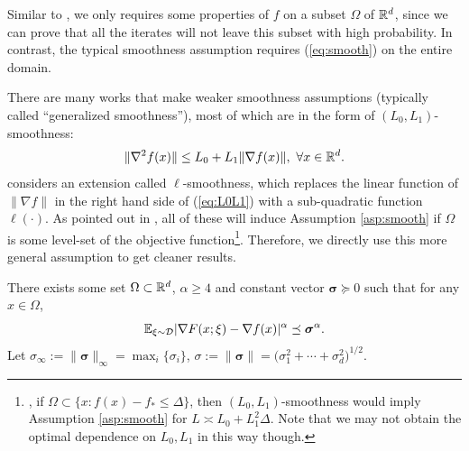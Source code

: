 \documentclass{article} %
\numberwithin{equation}{section}
\renewcommand{\eqref}[1]{(\ref{#1})}
\begin{document}
Similar to \citet{pmlr-v202-sadiev23a}, we only requires some properties of $f$ on a subset $\Omega$ of $\mathbb{R}^d$, since we can prove that all the iterates will not leave this subset with high probability. In contrast, the typical smoothness assumption requires \eqref{eq:smooth} on the entire domain.

There are many works \citep{zhang2019gradient, crawshaw2022robustness, faw2023beyond, wang2022provable, li2024convergence} that make weaker smoothness assumptions (typically called ``generalized smoothness''), most of which are in the form of $(L_0, L_1)$-smoothness:
\begin{equation}\label{eq:L0L1}
    \|\nabla^2 f(x)\| \leq L_0 + L_1 \|\nabla f(x)\|,\ \forall x\in \mathbb{R}^d.
\end{equation}
\citet{li2024convex} considers an extension called $\ell$-smoothness, which replaces the linear function of $\|\nabla f\|$ in the right hand side of \eqref{eq:L0L1} with a sub-quadratic function $\ell(\cdot)$.
As pointed out in \citet[Corollary 3.6]{li2024convex}, 
all of these will induce Assumption \ref{asp:smooth} if $\Omega$ is some level-set of the objective function\footnote{\eg, if $\Omega\subset \{x:f(x)-f_* \leq \Delta\}$, then $(L_0, L_1)$-smoothness would imply Assumption \ref{asp:smooth} for $L\asymp L_0+L_1^2\Delta$. Note that we may not obtain the optimal dependence on $L_0,L_1$ in this way though.}.  
Therefore, we directly use this more general assumption to get cleaner results.

\begin{asp}\label{asp:moment_noise}
    There exists some set $\Omega\subset \mathbb{R}^d$, $\alpha\geq 4$ and constant vector $\boldsymbol{\sigma}\succeq 0$ such that for any $x\in \Omega$,
    \begin{equation}
        \mathbb{E}_{\xi\sim \mathcal{D}} |\nabla F(x;\xi) - \nabla f(x)|^{\alpha} \preceq \boldsymbol{\sigma}^{\alpha}.
    \end{equation}
    Let $\sigma_{\infty}:=\|\boldsymbol{\sigma}\|_{\infty}=\max_i\{\sigma_i\}$, $\sigma:=\|\boldsymbol{\sigma}\|=\big(\sigma_1^2+\cdots+\sigma_d^2\big)^{1/2}$.
\end{asp}
\end{document}
